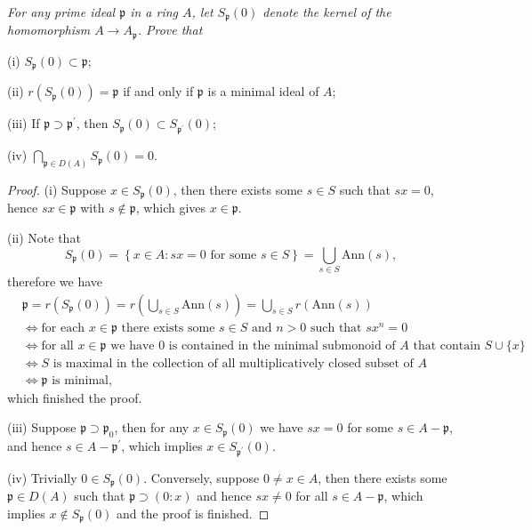 \begin{problem}\em
For any prime ideal $\mathfrak{p}$ in a ring $A$, let $S_\mathfrak{p}(0)$ denote the kernel of the homomorphism $A\to A_\mathfrak{p}$. Prove that \par
(i) $S_\mathfrak{p}(0)\subset\mathfrak{p}$;\par
(ii) $r(S_\mathfrak{p}(0))=\mathfrak{p}$ if and only if $\mathfrak{p}$ is a minimal ideal of $A$;\par
(iii) If $\mathfrak{p}\supset\mathfrak{p}^\prime$, then $S_\mathfrak{p}(0)\subset S_{\mathfrak{p}^\prime}(0)$;\par
(iv) $\bigcap_{\mathfrak{p}\in D(A)}S_\mathfrak{p}(0)=0$.
\end{problem}
\begin{proof}
(i) Suppose $x\in S_\mathfrak{p}(0)$, then there exists some $s\in S$ such that $sx=0$, hence $sx\in\mathfrak{p}$ with $s\notin\mathfrak{p}$, which gives $x\in\mathfrak{p}$.\par
(ii) Note that 
$$
S_{\mathfrak{p}}\left( 0 \right) =\left\{ x\in A:sx=0\text{ for some }s\in S \right\} =\bigcup_{s\in S}{\mathrm{Ann}\left( s \right)},
$$
therefore we have 
$$
\begin{aligned}
& \mathfrak{p} =r\left( S_{\mathfrak{p}}\left( 0 \right) \right) =r\left( \bigcup_{s\in S}{\mathrm{Ann}\left( s \right)} \right) =\bigcup_{s\in S}{r\left( \mathrm{Ann}\left( s \right) \right)} \\
& \iff \text{for each }x\in\mathfrak{p}\text{ there exists some }s\in S\text{ and }n>0\text{ such that }sx^n=0 \\
& \iff \text{for all }x\in\mathfrak{p}\text{ we have }0\text{ is contained in the minimal submonoid of }A\text{ that contain }S\cup\{x\} \\
& \iff S\text{ is maximal in the collection of all multiplicatively closed subset of }A \\
& \iff \mathfrak{p}\text{ is minimal},
\end{aligned}
$$
which finished the proof.\par
(iii) Suppose $\mathfrak{p}\supset\mathfrak{p}_0$, then for any $x\in S_\mathfrak{p}(0)$ we have $sx=0$ for some $s\in A-\mathfrak{p}$, and hence $s\in A-\mathfrak{p}^\prime$, which implies $x\in S_{\mathfrak{p}^\prime}(0)$.\par
(iv) Trivially $0\in S_\mathfrak{p}(0)$. Conversely, suppose $0\ne x\in A$, then there exists some $\mathfrak{p}\in D(A)$ such that $\mathfrak{p}\supset(0:x)$ and hence $sx\ne 0$ for all $s\in A-\mathfrak{p}$, which implies $x\notin S_\mathfrak{p}(0)$ and the proof is finished.
\end{proof}
